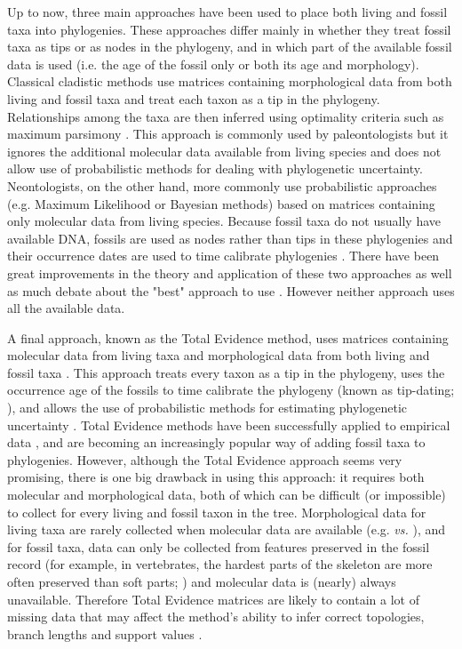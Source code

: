 \documentclass[12pt,letterpaper]{article}
\begin{document}
Up to now, three main approaches have been used to place both living and fossil taxa into phylogenies. These approaches differ mainly in whether they treat fossil taxa as tips or as nodes in the phylogeny, and in which part of the available fossil data is used (i.e. the age of the fossil only or both its age and morphology). Classical cladistic methods use matrices containing morphological data from both living and fossil taxa and treat each taxon as a tip in the phylogeny. Relationships among the taxa are then inferred using optimality criteria such as maximum parsimony \citep{simpson1945}. This approach is commonly used by paleontologists but it ignores the additional molecular data available from living species and does not allow use of probabilistic methods for dealing with phylogenetic uncertainty. Neontologists, on the other hand, more commonly use probabilistic approaches (e.g. Maximum Likelihood or Bayesian methods) based on matrices containing only molecular data from living species. Because fossil taxa do not usually have available DNA, fossils are used as nodes rather than tips in these phylogenies and their occurrence dates are used to time calibrate phylogenies \citep{zuckerkandl1965}. There have been great improvements in the theory and application of these two approaches \citep[e.g.][]{bapsta2013,stadlerdating2013,heaththe2013} as well as much debate about the "best" approach to use \citep[e.g.][]{spencerefficacy2013,wrightbayesian2014}. However neither approach uses all the available data.

A final approach, known as the Total Evidence method, uses matrices containing molecular data from living taxa and morphological data from both living and fossil taxa \citep{eernissetaxonomic1993}. This approach treats every taxon as a tip in the phylogeny, uses the occurrence age of the fossils to time calibrate the phylogeny (known as tip-dating; \citealt{ronquista2012}), and allows the use of probabilistic methods for estimating phylogenetic uncertainty \citep{ronquista2012}. Total Evidence methods have been successfully applied to empirical data \citep[e.g.][]{pyrondivergence2011,ronquista2012,schragocombining2013,slaterphylogenetic2013,beckancient2014}, and are becoming an increasingly popular way of adding fossil taxa to phylogenies.
However, although the Total Evidence approach seems very promising, there is one big drawback in using this approach: it requires both molecular and morphological data, both of which can be difficult (or impossible) to collect for every living and fossil taxon in the tree.
Morphological data for living taxa are rarely collected when molecular data are available (e.g. \citealt{O'Leary08022013} \textit{vs.} \citealt{meredithimpacts2011}), and for fossil taxa, data can only be collected from features preserved in the fossil record (for example, in vertebrates, the hardest parts of the skeleton are more often preserved than soft parts; \citealt{sansomfossilization2013}) and molecular data is (nearly) always unavailable. Therefore Total Evidence matrices are likely to contain a lot of missing data that may affect the method's ability to infer correct topologies, branch lengths and support values \citep{salamin2003}. 
\end{document}
